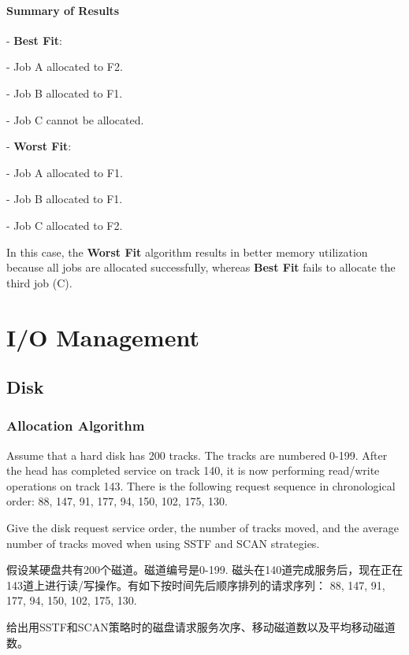 \documentclass[a4paper]{book}
\begin{document}
\subsubsection{Summary of Results}

- \textbf{Best Fit}:

  - Job A allocated to F2.
  
  - Job B allocated to F1.
  
  - Job C cannot be allocated.

- \textbf{Worst Fit}:

  - Job A allocated to F1.
  
  - Job B allocated to F1.
  
  - Job C allocated to F2.

In this case, the \textbf{Worst Fit} algorithm results in better memory utilization because all jobs are allocated successfully, whereas \textbf{Best Fit} fails to allocate the third job (C).

\chapter{I/O Management}

\section{Disk}

\subsection{Allocation Algorithm}

\begin{greenbox}
Assume that a hard disk has 200 tracks. The tracks are numbered 0-199. After the head has completed service on track 140, it is now performing read/write operations on track 143. There is the following request sequence in chronological order:
88, 147, 91, 177, 94, 150, 102, 175, 130.

Give the disk request service order, the number of tracks moved, and the average number of tracks moved when using SSTF and SCAN strategies.
\end{greenbox}

假设某硬盘共有200个磁道。磁道编号是0-199. 磁头在140道完成服务后，现在正在143道上进行读/写操作。有如下按时间先后顺序排列的请求序列：
88, 147, 91, 177, 94, 150, 102, 175, 130.

给出用SSTF和SCAN策略时的磁盘请求服务次序、移动磁道数以及平均移动磁道数。
\end{document}
